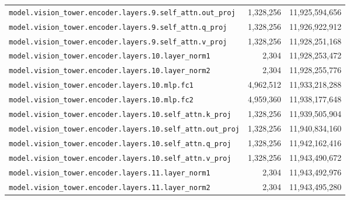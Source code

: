\documentclass[10pt,a4paper]{article}
\theoremstyle{definition}
\begin{document}
\begin{appendices}
\begin{longtable}{p{9.5cm}rr}
\texttt{model.\allowbreak{}vision\_tower.\allowbreak{}encoder.\allowbreak{}layers.\allowbreak{}9.\allowbreak{}self\_attn.\allowbreak{}out\_proj} & 1,328,256 & 11,925,594,656 \\
\texttt{model.\allowbreak{}vision\_tower.\allowbreak{}encoder.\allowbreak{}layers.\allowbreak{}9.\allowbreak{}self\_attn.\allowbreak{}q\_proj} & 1,328,256 & 11,926,922,912 \\
\texttt{model.\allowbreak{}vision\_tower.\allowbreak{}encoder.\allowbreak{}layers.\allowbreak{}9.\allowbreak{}self\_attn.\allowbreak{}v\_proj} & 1,328,256 & 11,928,251,168 \\
\texttt{model.\allowbreak{}vision\_tower.\allowbreak{}encoder.\allowbreak{}layers.\allowbreak{}10.\allowbreak{}layer\_norm1} & 2,304 & 11,928,253,472 \\
\texttt{model.\allowbreak{}vision\_tower.\allowbreak{}encoder.\allowbreak{}layers.\allowbreak{}10.\allowbreak{}layer\_norm2} & 2,304 & 11,928,255,776 \\
\texttt{model.\allowbreak{}vision\_tower.\allowbreak{}encoder.\allowbreak{}layers.\allowbreak{}10.\allowbreak{}mlp.\allowbreak{}fc1} & 4,962,512 & 11,933,218,288 \\
\texttt{model.\allowbreak{}vision\_tower.\allowbreak{}encoder.\allowbreak{}layers.\allowbreak{}10.\allowbreak{}mlp.\allowbreak{}fc2} & 4,959,360 & 11,938,177,648 \\
\texttt{model.\allowbreak{}vision\_tower.\allowbreak{}encoder.\allowbreak{}layers.\allowbreak{}10.\allowbreak{}self\_attn.\allowbreak{}k\_proj} & 1,328,256 & 11,939,505,904 \\
\texttt{model.\allowbreak{}vision\_tower.\allowbreak{}encoder.\allowbreak{}layers.\allowbreak{}10.\allowbreak{}self\_attn.\allowbreak{}out\_proj} & 1,328,256 & 11,940,834,160 \\
\texttt{model.\allowbreak{}vision\_tower.\allowbreak{}encoder.\allowbreak{}layers.\allowbreak{}10.\allowbreak{}self\_attn.\allowbreak{}q\_proj} & 1,328,256 & 11,942,162,416 \\
\texttt{model.\allowbreak{}vision\_tower.\allowbreak{}encoder.\allowbreak{}layers.\allowbreak{}10.\allowbreak{}self\_attn.\allowbreak{}v\_proj} & 1,328,256 & 11,943,490,672 \\
\texttt{model.\allowbreak{}vision\_tower.\allowbreak{}encoder.\allowbreak{}layers.\allowbreak{}11.\allowbreak{}layer\_norm1} & 2,304 & 11,943,492,976 \\
\texttt{model.\allowbreak{}vision\_tower.\allowbreak{}encoder.\allowbreak{}layers.\allowbreak{}11.\allowbreak{}layer\_norm2} & 2,304 & 11,943,495,280 \\

\end{longtable}
\end{appendices}
\end{document}
